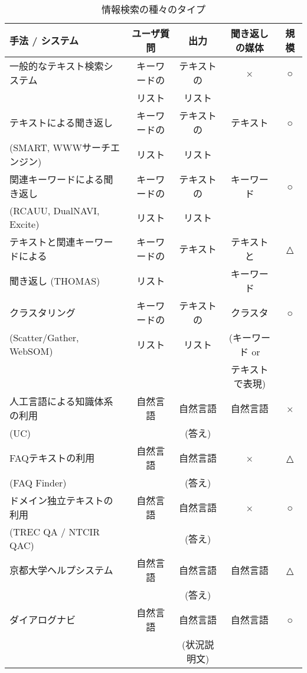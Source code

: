 \begin{table}
 \caption{情報検索の種々のタイプ} \label{tab:情報検索の種々のタイプ}
 \begin{center} \footnotesize
  \begin{tabular}{l|cccc} \hline
   手法 / システム      & ユーザ質問 & 出力 & 聞き返しの媒体 & 規模 \\ \hline \hline
   一般的なテキスト検索システム & キーワードの & テキストの & × & ○ \\
                        & リスト       & リスト \\ \hline
   テキストによる聞き返し & キーワードの & テキストの & テキスト & ○ \\
   (SMART, WWWサーチエンジン) & リスト & リスト \\ \hline
   関連キーワードによる聞き返し       & キーワードの & テキストの & キーワード & ○ \\
   (RCAUU, DualNAVI, Excite)      & リスト       & リスト \\ \hline
   テキストと関連キーワードによる & キーワードの & テキスト   & テキストと & △ \\
   聞き返し (THOMAS)             & リスト       &            & キーワード & \\ \hline
   クラスタリング       & キーワードの & テキストの & クラスタ & ○ \\
   (Scatter/Gather, WebSOM) & リスト   & リスト     & (キーワード or \\
                        &              &            &  テキストで表現) &
   \\ \hline \hline
   人工言語による知識体系の利用 & 自然言語     & 自然言語   & 自然言語   & × \\
   (UC)                 &              & (答え)     &            & \\ \hline
   FAQテキストの利用    & 自然言語     & 自然言語   & ×         & △ \\
   (FAQ Finder)         &              & (答え)     &            & \\ \hline
   ドメイン独立テキストの利用 & 自然言語     & 自然言語   & ×         & ○ \\
   (TREC QA / NTCIR QAC)&              & (答え)     &            & \\ \hline
   京都大学ヘルプシステム & 自然言語     & 自然言語   & 自然言語   & △ \\
                        &              & (答え)     &            & \\
                        \hline \hline
   ダイアログナビ       & 自然言語     & 自然言語   & 自然言語   & ○ \\
                        &              & (状況説明文) &            & \\ \hline
  \end{tabular}
  
 \end{center}

\end{table}


